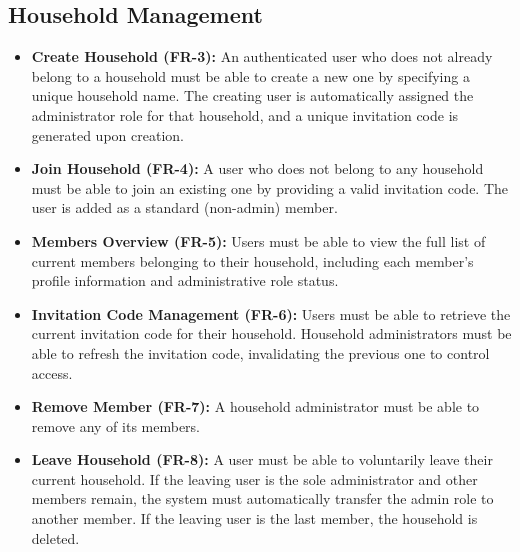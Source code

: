 \subsection{Household Management}
\begin{itemize}
    \item \textbf{Create Household (FR-3):} An authenticated user who does not already belong to a household must be able to create a new one by specifying a unique household name. The creating user is automatically assigned the administrator role for that household, and a unique invitation code is generated upon creation.
    \item \textbf{Join Household (FR-4):} A user who does not belong to any household must be able to join an existing one by providing a valid invitation code. The user is added as a standard (non-admin) member.
    \item \textbf{Members Overview (FR-5):} Users must be able to view the full list of current members belonging to their household, including each member's profile information and administrative role status.
    \item \textbf{Invitation Code Management (FR-6):} Users must be able to retrieve the current invitation code for their household. Household administrators must be able to refresh the invitation code, invalidating the previous one to control access.
    \item \textbf{Remove Member (FR-7):} A household administrator must be able to remove any of its members.
    \item \textbf{Leave Household (FR-8):} A user must be able to voluntarily leave their current household. If the leaving user is the sole administrator and other members remain, the system must automatically transfer the admin role to another member. If the leaving user is the last member, the household is deleted.
\end{itemize}

